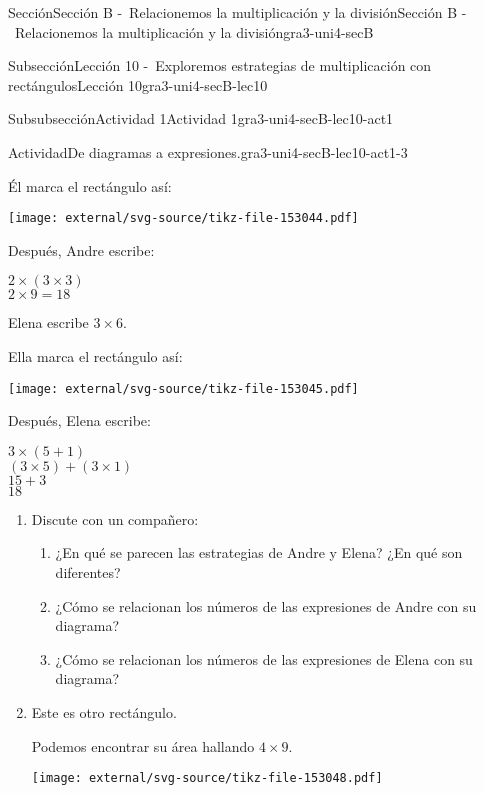 \documentclass[twoside,14pt,]{extarticle}
\begin{document}
\begin{sectionptx}{Sección}{Sección B -~Relacionemos la multiplicación y la división}{}{Sección B -~Relacionemos la multiplicación y la división}{}{}{gra3-uni4-secB}
\begin{subsectionptx}{Subsección}{Lección 10 -~Exploremos estrategias de multiplicación con rectángulos}{}{Lección 10}{}{}{gra3-uni4-secB-lec10}
\begin{subsubsectionptx}{Subsubsección}{Actividad 1}{}{Actividad 1}{}{}{gra3-uni4-secB-lec10-act1}
\begin{activity}{Actividad}{De diagramas a expresiones.}{gra3-uni4-secB-lec10-act1-3}
\begin{sidebyside}{3}{0}{0}{0.065}
\begin{sbspanel}{0.35}
Él marca el rectángulo así:%
\par
\texttt{[image: external/svg-source/tikz-file-153044.pdf]}
\end{sbspanel}%
\begin{sbspanel}{0.25}%
Después, Andre escribe:%
\par
\(2 \times (3 \times 3)\)\\
 \(2 \times 9 = 18\)%
\end{sbspanel}%
\end{sidebyside}%
\begin{sidebyside}{3}{0}{0}{0.065}%
\begin{sbspanel}{0.27}%
Elena escribe \(3\times 6\).%
\end{sbspanel}%
\begin{sbspanel}{0.35}%
Ella marca el rectángulo así:%
\par
\texttt{[image: external/svg-source/tikz-file-153045.pdf]}
\end{sbspanel}%
\begin{sbspanel}{0.25}%
Después, Elena escribe:%
\par
\(3 \times (5 + 1)\)\\
 \((3 \times 5) + (3 \times 1)\)\\
 \(15+3\)\\
 \(18\)%
\end{sbspanel}%
\end{sidebyside}%
%
\begin{enumerate}
\item{}Discute con un compañero:%
%
\begin{enumerate}
\item{}¿En qué se parecen las estrategias de Andre y Elena? ¿En qué son diferentes?%
\item{}¿Cómo se relacionan los números de las expresiones de Andre con su diagrama?%
\item{}¿Cómo se relacionan los números de las expresiones de Elena con su diagrama?%
\end{enumerate}
\item{}\begin{sidebyside}{2}{0}{0}{0}%
\begin{sbspanel}{0.5}%
Este es otro rectángulo.%
\par
Podemos encontrar su área hallando \(4 \times 9\).%
\end{sbspanel}%
\begin{sbspanel}{0.5}%
\texttt{[image: external/svg-source/tikz-file-153048.pdf]}

\end{sbspanel}
\end{sidebyside}
\end{enumerate}
\end{activity}
\end{subsubsectionptx}
\end{subsectionptx}
\end{sectionptx}
\end{document}
